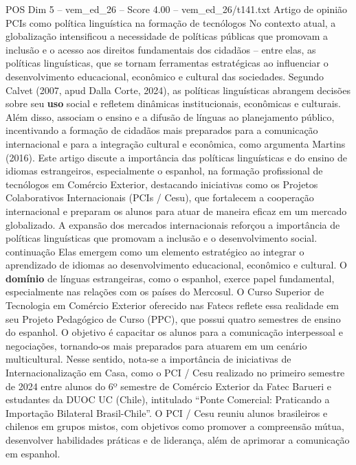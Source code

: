 \begin{textsample}{POS Dim 5 – vem\_ed\_26 – Score 4.00 – vem\_ed\_26/t141.txt}  \label{ex:f5_pos_075}
Artigo de opinião PCIs como política linguística na formação de tecnólogos No contexto atual, a globalização intensificou a necessidade de políticas públicas que promovam a inclusão e o acesso aos direitos fundamentais dos cidadãos – entre elas, as políticas linguísticas, que se tornam ferramentas estratégicas ao influenciar o desenvolvimento educacional, econômico e cultural das sociedades.
Segundo Calvet (2007, apud Dalla Corte, 2024), as políticas linguísticas abrangem decisões sobre seu \textbf{uso} social e refletem dinâmicas institucionais, econômicas e culturais.
Além disso, associam o ensino e a difusão de línguas ao planejamento público, incentivando a formação de cidadãos mais preparados para a comunicação internacional e para a integração cultural e econômica, como argumenta Martins (2016).
Este artigo discute a importância das políticas linguísticas e do ensino de idiomas estrangeiros, especialmente o espanhol, na formação profissional de tecnólogos em Comércio Exterior, destacando iniciativas como os Projetos Colaborativos Internacionais (PCIs / Cesu), que fortalecem a cooperação internacional e preparam os alunos para atuar de maneira eficaz em um mercado globalizado.
A expansão dos mercados internacionais reforçou a importância de políticas linguísticas que promovam a inclusão e o desenvolvimento social. continuação Elas emergem como um elemento estratégico ao integrar o aprendizado de idiomas ao desenvolvimento educacional, econômico e cultural.
O \textbf{domínio} de línguas estrangeiras, como o espanhol, exerce papel fundamental, especialmente nas relações com os países do Mercosul.
O Curso Superior de Tecnologia em Comércio Exterior oferecido nas Fatecs reflete essa realidade em seu Projeto Pedagógico de Curso (PPC), que possui quatro semestres de ensino do espanhol.
O objetivo é capacitar os alunos para a comunicação interpessoal e negociações, tornando-os mais preparados para atuarem em um cenário multicultural.
Nesse sentido, nota-se a importância de iniciativas de Internacionalização em Casa, como o PCI / Cesu realizado no primeiro semestre de 2024 entre alunos do 6º semestre de Comércio Exterior da Fatec Barueri e estudantes da DUOC UC (Chile), intitulado “Ponte Comercial: Praticando a Importação Bilateral Brasil-Chile”.
O PCI / Cesu reuniu alunos brasileiros e chilenos em grupos mistos, com objetivos como promover a compreensão mútua, desenvolver habilidades práticas e de liderança, além de aprimorar a comunicação em espanhol.

\end{textsample}
